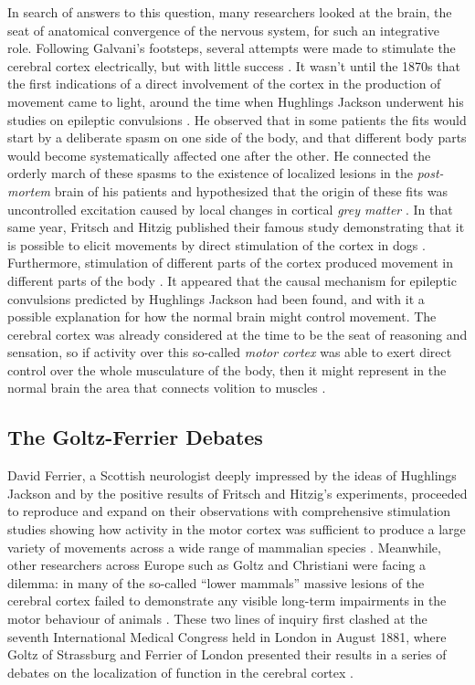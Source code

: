 In search of answers to this question, many researchers looked at the brain, the seat of anatomical convergence of the nervous system, for such an integrative role. Following Galvani's footsteps, several attempts were made to stimulate the cerebral cortex electrically, but with little success \cite{Gross2007}. It wasn't until the 1870s that the first indications of a direct involvement of the cortex in the production of movement came to light, around the time when Hughlings Jackson underwent his studies on epileptic convulsions \cite{Jackson1870}. He observed that in some patients the fits would start by a deliberate spasm on one side of the body, and that different body parts would become systematically affected one after the other. He connected the orderly march of these spasms to the existence of localized lesions in the \emph{post-mortem} brain of his patients and hypothesized that the origin of these fits was uncontrolled excitation caused by local changes in cortical \emph{grey matter} \cite{Jackson1870}. In that same year, Fritsch and Hitzig published their famous study demonstrating that it is possible to elicit movements by direct stimulation of the cortex in dogs \cite{Fritsch1870}. Furthermore, stimulation of different parts of the cortex produced movement in different parts of the body \cite{Fritsch1870}. It appeared that the causal mechanism for epileptic convulsions predicted by Hughlings Jackson had been found, and with it a possible explanation for how the normal brain might control movement. The cerebral cortex was already considered at the time to be the seat of reasoning and sensation, so if activity over this so-called \emph{motor cortex} was able to exert direct control over the whole musculature of the body, then it might represent in the normal brain the area that connects volition to muscles \cite{Fritsch1870}.

\subsection{The Goltz-Ferrier Debates}

David Ferrier, a Scottish neurologist deeply impressed by the ideas of Hughlings Jackson and by the positive results of Fritsch and Hitzig's experiments, proceeded to reproduce and expand on their observations with comprehensive stimulation studies showing how activity in the motor cortex was sufficient to produce a large variety of movements across a wide range of mammalian species \cite{Ferrier1873}. Meanwhile, other researchers across Europe such as Goltz and Christiani were facing a dilemma: in many of the so-called ``lower mammals'' massive lesions of the cerebral cortex failed to demonstrate any visible long-term impairments in the motor behaviour of animals \cite{James1885,Goltz1888}.  These two lines of inquiry first clashed at the seventh International Medical Congress held in London in August 1881, where Goltz of Strassburg and Ferrier of London presented their results in a series of debates on the localization of function in the cerebral cortex \cite{Phillips1984,Tyler2000}.

